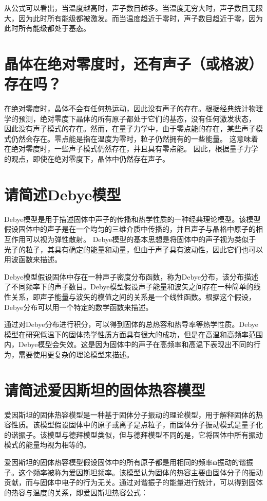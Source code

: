 \documentclass[12pt, a4paper, oneside]{ctexart}
\begin{document}
\begin{spacing}{2.0}
从公式可以看出，当温度越高时，声子数目越多。当温度无穷大时，声子数目无限大，因为此时所有能级都被激发。而当温度趋近于零时，声子数目趋近于零，因为此时所有能级都处于基态。
\section{晶体在绝对零度时，还有声子（或格波）存在吗？}
在绝对零度时，晶体不会有任何热运动，因此没有声子的存在。根据经典统计物理学的预测，绝对零度下晶体的所有原子都处于它们的基态，没有任何激发状态，
因此没有声子模式的存在。然而，在量子力学中，由于零点能的存在，某些声子模式仍然会存在。零点能是指在温度为零时，粒子仍然拥有的一些能量。
这意味着在绝对零度时，一些声子模式仍然存在，并且具有零点能。
因此，根据量子力学的观点，即使在绝对零度下，晶体中仍然存在声子。
\section{请简述Debye模型}
Debye模型是用于描述固体中声子的传播和热学性质的一种经典理论模型。该模型假设固体中的声子是在一个均匀的三维介质中传播的，并且声子与晶格中原子的相互作用可以视为弹性散射。
Debye模型的基本思想是将固体中的声子视为类似于光子的粒子，其具有确定的能量和动量，但由于声子具有波动性，因此它们也可以用波函数来描述。

Debye模型假设固体中存在一种声子密度分布函数，称为Debye分布，该分布描述了不同频率下的声子数目。Debye模型假设声子能量和波矢之间存在一种简单的线性关系，即声子能量与波矢的模值之间的关系是一个线性函数。根据这个假设，Debye分布可以用一个特定的数学函数来描述。

通过对Debye分布进行积分，可以得到固体的总热容和热导率等热学性质。Debye模型在研究低温下的固体热学性质方面具有很大的成功，但是在高温和高频率范围内，Debye模型会失效。这是因为固体中的声子在高频率和高温下表现出不同的行为，需要使用更复杂的理论模型来描述。
\section{请简述爱因斯坦的固体热容模型}
爱因斯坦的固体热容模型是一种基于固体分子振动的理论模型，用于解释固体的热容性质。该模型假设固体中的原子或离子是点粒子，而固体分子振动模式是量子化的谐振子。该模型与德拜模型类似，但与德拜模型不同的是，它将固体中所有振动模式的能量均视为相等的。

爱因斯坦的固体热容模型假设固体中的所有原子都是用相同的频率ω振动的谐振子。这个频率被称为爱因斯坦频率。该模型认为固体的热容主要由固体分子的振动贡献，而与固体中电子的行为无关。通过对谐振子的能量进行统计，可以得到固体的热容与温度的关系，即爱因斯坦热容公式：


\end{spacing}
\end{document}
